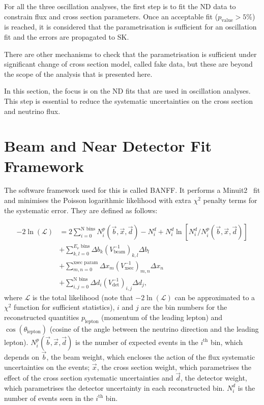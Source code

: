 For all the three oscillation analyses, the first step is to fit the
\Gls{ND} data to constrain flux and cross section parameters. Once an
acceptable fit ($p_\text{value} > 5\%$) is reached, it is considered
that the parametrisation is sufficient for an oscillation fit and the
errors are propagated to \Gls{SK}.

There are other mechanisms to check that the parametrisation is
sufficient under significant change of cross section model, called
fake data, but these are beyond the scope of the analysis that is
presented here.

In this section, the focus is on the \Gls{ND} fits that are used in
oscillation analyses. This step is essential to reduce the systematic
uncertainties on the cross section and neutrino flux.


\section{Beam and Near Detector Fit Framework}
\label{sec:BANFF}
The software framework used for this is called \Gls{BANFF}. It
performs a Minuit2~\cite{James:1975dr} fit and minimises the Poisson
logarithmic likelihood with extra $\chi^2$ penalty terms for the
systematic error. They are defined as follows:

\begin{align}
  \label{eq:likelihood}
  -2\ln(\mathcal{L}) &= 2 \sum_{i=0}^{\text{N bins}}N^{p}_{i}(\vec{b},\vec{x},\vec{d})-N^{d}_{i}
                       +N^{d}_{i}\ln[N^{d}_{i}/N^{p}_{i}(\vec{b},\vec{x},\vec{d})] \\
                     &+\sum_{k,l=0}^{E_{\nu}\text{~bins}}\Delta b_{k}(V^{-1}_\text{beam})_{k,l}\Delta b_{l} \nonumber \\
                     &+\sum_{m,n=0}^{\text{xsec param}}\Delta x_{m}(V^{-1}_\text{xsec})_{m,n}\Delta x_{n} \nonumber \\
                     &+\sum_{i,j=0}^{\text{N bins}}\Delta d_{i}(V^{-1}_{\text{det}})_{i,j}\Delta d_{j},\nonumber 
\end{align}
where $\mathcal{L}$ is the total likelihood (note that
$-2\ln(\mathcal{L})$ can be approximated to a $\chi^2$ function for
sufficient statistics), $i$ and $j$ are the bin numbers for the
reconstructed quantities $p_\text{lepton}$ (momentum of the leading
lepton) and $\cos(\theta_\text{lepton})$ (cosine of the angle between
the neutrino direction and the leading
lepton). $N^{p}_{i}(\vec{b},\vec{x},\vec{d})$ is the number of
expected events in the $i^{\text{th}}$ bin, which depends on
$\vec{b}$, the beam weight, which encloses the action of the flux
systematic uncertainties on the events; $\vec{x}$, the cross section
weight, which parametrises the effect of the cross section systematic
uncertainties and $\vec{d}$, the detector weight, which parametrises
the detector uncertainty in each reconstructed bin. $N^d_i$ is the
number of events seen in the $i^{\text{th}}$ bin.

